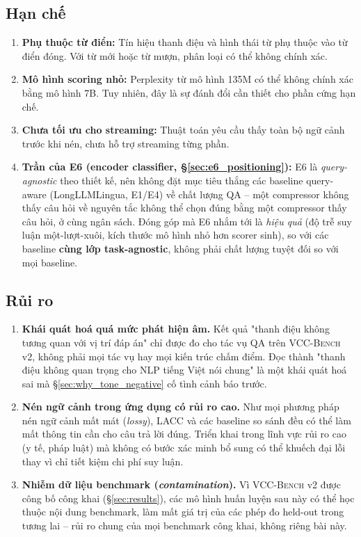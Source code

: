 \documentclass[12pt,a4paper]{article}
\newcommand{\method}[1]{\textsc{#1}}         %
\begin{document}
\subsection{Hạn chế}
\label{sec:limitations}

\begin{enumerate}[label=(\arabic*),leftmargin=*]
    \item \textbf{Phụ thuộc từ điển:} Tín hiệu thanh điệu và hình thái từ phụ thuộc vào từ điển đóng. Với từ mới hoặc từ mượn, phân loại có thể không chính xác.
    \item \textbf{Mô hình scoring nhỏ:} Perplexity từ mô hình 135M có thể không chính xác bằng mô hình 7B. Tuy nhiên, đây là sự đánh đổi cần thiết cho phần cứng hạn chế.
    \item \textbf{Chưa tối ưu cho streaming:} Thuật toán yêu cầu thấy toàn bộ ngữ cảnh trước khi nén, chưa hỗ trợ streaming từng phần.
    \item \textbf{Trần của E6 (encoder classifier, \S\ref{sec:e6_positioning}):} E6 là \textit{query-agnostic} theo thiết kế, nên không đặt mục tiêu thắng các baseline query-aware (LongLLMLingua, E1/E4) về chất lượng QA -- một compressor không thấy câu hỏi về nguyên tắc không thể chọn đúng bằng một compressor thấy câu hỏi, ở cùng ngân sách. Đóng góp mà E6 nhắm tới là \textit{hiệu quả} (độ trễ suy luận một-lượt-xuôi, kích thước mô hình nhỏ hơn scorer sinh), so với các baseline \textbf{cùng lớp task-agnostic}, không phải chất lượng tuyệt đối so với mọi baseline.
\end{enumerate}

\subsection{Rủi ro}

\begin{enumerate}[label=(\arabic*),leftmargin=*]
    \item \textbf{Khái quát hoá quá mức phát hiện âm.} Kết quả "thanh điệu không tương quan với vị trí đáp án" chỉ được đo cho tác vụ QA trên \method{VCC-Bench} v2, không phải mọi tác vụ hay mọi kiến trúc chấm điểm. Đọc thành "thanh điệu không quan trọng cho NLP tiếng Việt nói chung" là một khái quát hoá sai mà \S\ref{sec:why_tone_negative} cố tình cảnh báo trước.
    \item \textbf{Nén ngữ cảnh trong ứng dụng có rủi ro cao.} Như mọi phương pháp nén ngữ cảnh mất mát (\textit{lossy}), \method{LACC} và các baseline so sánh đều có thể làm mất thông tin cần cho câu trả lời đúng. Triển khai trong lĩnh vực rủi ro cao (y tế, pháp luật) mà không có bước xác minh bổ sung có thể khuếch đại lỗi thay vì chỉ tiết kiệm chi phí suy luận.
    \item \textbf{Nhiễm dữ liệu benchmark (\textit{contamination}).} Vì \method{VCC-Bench} v2 được công bố công khai (\S\ref{sec:results}), các mô hình huấn luyện sau này có thể học thuộc nội dung benchmark, làm mất giá trị của các phép đo held-out trong tương lai -- rủi ro chung của mọi benchmark công khai, không riêng bài này.
\end{enumerate}
\end{document}
